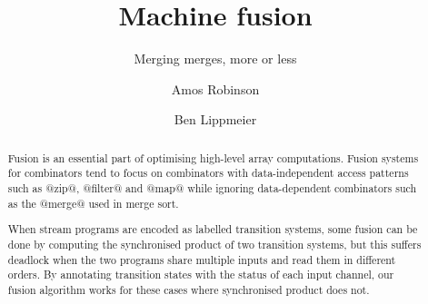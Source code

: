 \documentclass[acmlarge,review,anonymous]{acmart}\settopmatter{printfolios=true}
\begin{document}
\title{Machine fusion}
\subtitle{Merging merges, more or less}

\author{Amos Robinson}

\author{Ben Lippmeier}

\makeatactive
\begin{abstract}
Fusion is an essential part of optimising high-level array computations.
Fusion systems for combinators tend to focus on combinators with data-independent access patterns such as @zip@, @filter@ and @map@ while ignoring data-dependent combinators such as the @merge@ used in merge sort.

When stream programs are encoded as labelled transition systems, some fusion can be done by computing the synchronised product of two transition systems, but this suffers deadlock when the two programs share multiple inputs and read them in different orders.
By annotating transition states with the status of each input channel, our fusion algorithm works for these cases where synchronised product does not.
\end{abstract}


\maketitle













\end{document}
